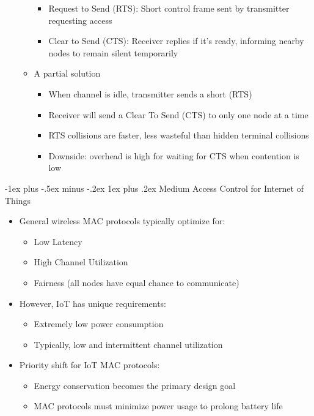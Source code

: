 \documentclass[10pt,landscape]{article}
\makeatletter
\newcommand{\subsubsubsection}{\@startsection{subsubsection}{3}{0mm}%
                                {-1ex plus -.5ex minus -.2ex}%
                                {1ex plus .2ex}%
                                {\normalfont\scriptsize\bfseries}}
\newcommand{\1}{\mathmybb{1}}
\makeatother
\begin{document}
\begin{multicols*}{3}
\begin{itemize}
\begin{itemize}
    \begin{itemize}
      \item Request to Send (RTS): Short control frame sent by transmitter requesting access
      \item Clear to Send (CTS): Receiver replies if it’s ready, informing nearby nodes to
      remain silent temporarily
    \end{itemize}
    \item A partial solution
    \begin{itemize}
      \item When channel is idle, transmitter sends a short (RTS)
      \item Receiver will send a Clear To Send (CTS) to only one node at a time
      \item RTS collisions are faster, less wasteful than hidden terminal collisions
      \item Downside: overhead is high for waiting for CTS when contention is low
    \end{itemize}
  \end{itemize}
\end{itemize}

\subsubsubsection{Medium Access Control for Internet of Things}
\begin{itemize}
  \item General wireless MAC protocols typically optimize for:
  \begin{itemize}
    \item Low Latency
    \item High Channel Utilization
    \item Fairness (all nodes have equal chance to communicate)
  \end{itemize}
  \item However, IoT has unique requirements:
  \begin{itemize}
    \item Extremely low power consumption
    \item Typically, low and intermittent channel utilization
  \end{itemize}
  \item Priority shift for IoT MAC protocols:
  \begin{itemize}
    \item Energy conservation becomes the primary design goal
    \item MAC protocols must minimize power usage to prolong battery life
  \end{itemize}
\end{itemize}


\end{multicols*}
\end{document}
